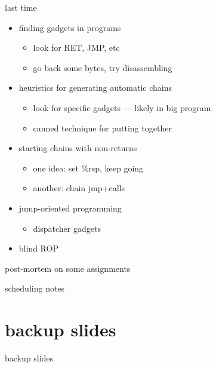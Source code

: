 \date{}
\title{}
\date{}

\begin{frame}
    \titlepage
\end{frame}



\usetikzlibrary{arrows.meta,patterns}

\begin{frame}{last time}
    \begin{itemize}
    \item finding gadgets in programs
        \begin{itemize}
        \item look for RET, JMP, etc
        \item go back some bytes, try disassembling
        \end{itemize}
    \item heuristics for generating automatic chains
        \begin{itemize}
        \item look for specific gadgets --- likely in big program
        \item canned technique for putting together
        \end{itemize}
    \item starting chains with non-returns
        \begin{itemize}
        \item one idea: set \%rsp, keep going
        \item another: chain jmp+calls
        \end{itemize}
    \item jump-oriented programming
        \begin{itemize}
        \item dispatcher gadgets
        \end{itemize}
    \item blind ROP
    \end{itemize}
\end{frame}

\begin{frame}{post-mortem on some assignments}
\end{frame}

\begin{frame}{scheduling notes}
\end{frame}

 




\section{backup slides}
\begin{frame}{backup slides}
\end{frame}


